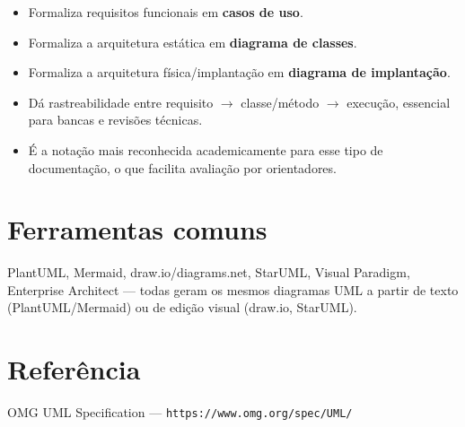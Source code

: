 \documentclass[11pt,a4paper]{article}
\begin{document}
\begin{itemize}
  \item Formaliza requisitos funcionais em \textbf{casos de uso}.
  \item Formaliza a arquitetura estática em \textbf{diagrama de classes}.
  \item Formaliza a arquitetura física/implantação em \textbf{diagrama de
    implantação}.
  \item Dá rastreabilidade entre requisito $\rightarrow$ classe/método
    $\rightarrow$ execução, essencial para bancas e revisões técnicas.
  \item É a notação mais reconhecida academicamente para esse tipo de
    documentação, o que facilita avaliação por orientadores.
\end{itemize}

\section*{Ferramentas comuns}

PlantUML, Mermaid, draw.io/diagrams.net, StarUML, Visual Paradigm,
Enterprise Architect --- todas geram os mesmos diagramas UML a partir de
texto (PlantUML/Mermaid) ou de edição visual (draw.io, StarUML).

\section*{Referência}

OMG UML Specification --- \texttt{https://www.omg.org/spec/UML/}
\end{document}
